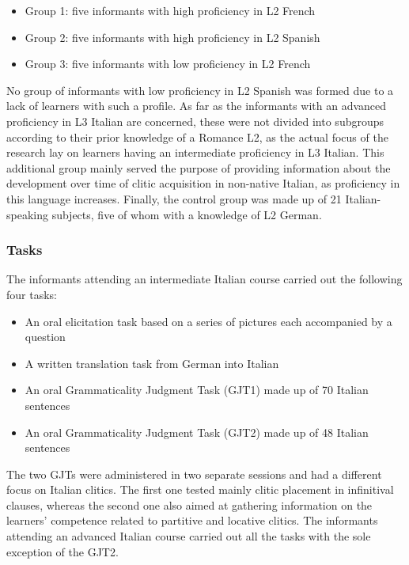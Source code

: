 \documentclass[output=paper,modfonts,nonflat,newtxmath]{langsci/langscibook}
\begin{document}
\begin{itemize}
\item
Group 1: five informants with high proficiency in L2 French

\item
Group 2: five informants with high proficiency in L2 Spanish

\item
Group 3: five informants with low proficiency in L2 French

\end{itemize}

No group of informants with low proficiency in L2 Spanish was formed due to a lack of learners with such a profile. As far as the informants with an advanced proficiency in L3 Italian are concerned, these were not divided into subgroups according to their prior knowledge of a Romance L2, as the actual focus of the research lay on learners having an intermediate proficiency in L3 Italian. This additional group mainly served the purpose of providing information about the development over time of clitic acquisition in non-native Italian, as proficiency in this language increases. Finally, the control group was made up of 21 Italian-speaking subjects, five of whom with a knowledge of L2 German.

   \subsubsection{Tasks} %

The informants attending an intermediate Italian course carried out the following four tasks:

\begin{itemize}
\item
An oral elicitation task based on a series of pictures each accompanied by a question

\item
A written translation task from German into Italian

\item
An oral Grammaticality Judgment Task (GJT1) made up of 70 Italian sentences

\item
An oral Grammaticality Judgment Task (GJT2) made up of 48 Italian sentences

\end{itemize}

The two GJTs were administered in two separate sessions and had a different focus on Italian clitics. The first one tested mainly clitic placement in infinitival clauses, whereas the second one also aimed at gathering information on the learners’ competence related to partitive and locative clitics. The informants attending an advanced Italian course carried out all the tasks with the sole exception of the GJT2.
\end{document}

